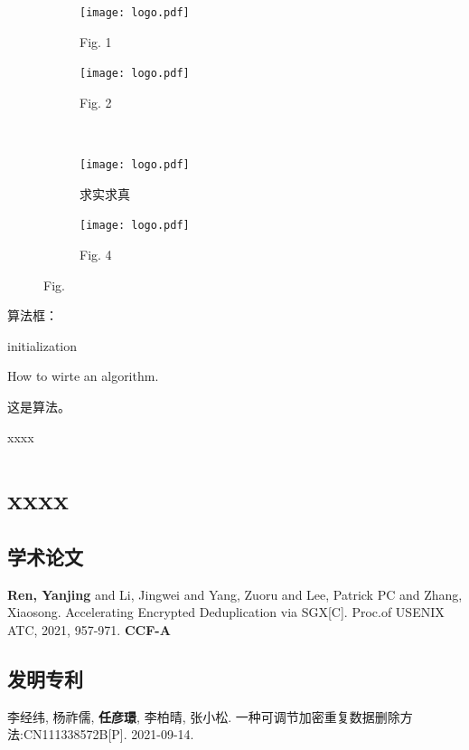 \documentclass[master]{thesis-uestc}
\begin{document}
\begin{figure}[!htbp]
    \centering
    \begin{subfigure}[t]{0.35\linewidth}
        \centering
        \texttt{[image: logo.pdf]}
        \caption{Fig. 1}
        \label{fig:1-1}
    \end{subfigure}
    \begin{subfigure}[t]{0.35\linewidth}
        \centering
        \texttt{[image: logo.pdf]}
        \caption{Fig. 2}
        \label{fig:1-2}
    \end{subfigure}
    \\[6bp]
    \begin{subfigure}[t]{0.35\linewidth}
        \centering
        \texttt{[image: logo.pdf]}
        \caption{求实求真}
        \label{fig:1-3}
    \end{subfigure}
    \begin{subfigure}[t]{0.35\linewidth}
        \centering
        \texttt{[image: logo.pdf]}
        \caption{Fig. 4}
        \label{fig:1-4}
    \end{subfigure}
    \caption{Fig.}
    \label{fig:1}
\end{figure}
算法框：

\begin{algorithm}[H]\label{alg:1}
    initialization\;
    \caption{How to wirte an algorithm.}
\end{algorithm}

这是算法。

\thesisacknowledgement

xxxx %


\thesisappendix
\chapter{xxxx} %

\begin{thesistheaccomplish}
    \section{学术论文}
     \textbf{Ren, Yanjing} and Li, Jingwei and Yang, Zuoru and Lee, Patrick PC and Zhang, Xiaosong. Accelerating Encrypted Deduplication via SGX[C]. Proc.of USENIX ATC, 2021, 957-971. \textbf{CCF-A}
    \section{发明专利}
     李经纬, 杨祚儒, \textbf{任彦璟}, 李柏晴, 张小松. 一种可调节加密重复数据删除方法:CN111338572B[P]. 2021-09-14.
\end{thesistheaccomplish}
\end{document}
